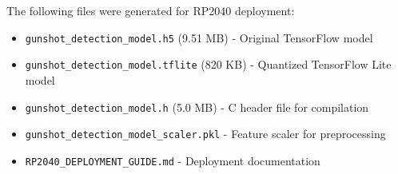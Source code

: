 \documentclass[12pt]{article}
\begin{document}
The following files were generated for RP2040 deployment:
\begin{itemize}
    \item \texttt{gunshot\_detection\_model.h5} (9.51 MB) - Original TensorFlow model
    \item \texttt{gunshot\_detection\_model.tflite} (820 KB) - Quantized TensorFlow Lite model
    \item \texttt{gunshot\_detection\_model.h} (5.0 MB) - C header file for compilation
    \item \texttt{gunshot\_detection\_model\_scaler.pkl} - Feature scaler for preprocessing
    \item \texttt{RP2040\_DEPLOYMENT\_GUIDE.md} - Deployment documentation
\end{itemize}
\end{document}
